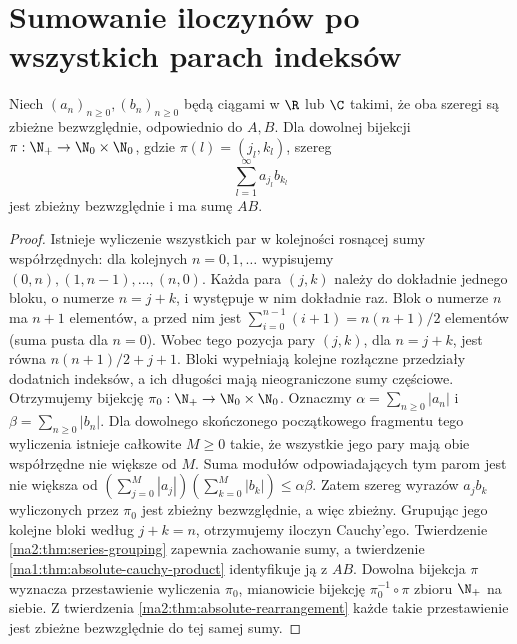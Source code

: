 \section{Sumowanie iloczynów po wszystkich parach indeksów}
\begin{twierdzenie}
\label{ma1:thm:pair-enumeration}
Niech $(a_n)_{n\ge0},(b_n)_{n\ge0}$ będą ciągami w $\R$ lub $\C$ takimi, że oba szeregi są zbieżne bezwzględnie, odpowiednio do $A,B$. Dla dowolnej bijekcji $\pi:\N_+\to\N_0\times\N_0$, gdzie $\pi(l)=(j_l,k_l)$, szereg
\[
 \sum_{l=1}^\infty a_{j_l}b_{k_l}
\]
jest zbieżny bezwzględnie i ma sumę $AB$.
\end{twierdzenie}
\begin{proof}
Istnieje wyliczenie wszystkich par w kolejności rosnącej sumy współrzędnych: dla kolejnych $n=0,1,\ldots$ wypisujemy $(0,n),(1,n-1),\ldots,(n,0)$. Każda para $(j,k)$ należy do dokładnie jednego bloku, o numerze $n=j+k$, i występuje w nim dokładnie raz. Blok o numerze $n$ ma $n+1$ elementów, a przed nim jest $\sum_{i=0}^{n-1}(i+1)=n(n+1)/2$ elementów (suma pusta dla $n=0$). Wobec tego pozycja pary $(j,k)$, dla $n=j+k$, jest równa $n(n+1)/2+j+1$. Bloki wypełniają kolejne rozłączne przedziały dodatnich indeksów, a ich długości mają nieograniczone sumy częściowe. Otrzymujemy bijekcję $\pi_0:\N_+\to\N_0\times\N_0$.
Oznaczmy $\alpha=\sum_{n\ge0}|a_n|$ i $\beta=\sum_{n\ge0}|b_n|$. Dla dowolnego skończonego początkowego fragmentu tego wyliczenia istnieje całkowite $M\ge0$ takie, że wszystkie jego pary mają obie współrzędne nie większe od $M$. Suma modułów odpowiadających tym parom jest nie większa od
$(\sum_{j=0}^M|a_j|)(\sum_{k=0}^M|b_k|)\le\alpha\beta$. Zatem szereg wyrazów $a_jb_k$ wyliczonych przez $\pi_0$ jest zbieżny bezwzględnie, a więc zbieżny.
Grupując jego kolejne bloki według $j+k=n$, otrzymujemy iloczyn Cauchy'ego. Twierdzenie \ref{ma2:thm:series-grouping} zapewnia zachowanie sumy, a twierdzenie \ref{ma1:thm:absolute-cauchy-product} identyfikuje ją z $AB$. Dowolna bijekcja $\pi$ wyznacza przestawienie wyliczenia $\pi_0$, mianowicie bijekcję $\pi_0^{-1}\circ\pi$ zbioru $\N_+$ na siebie. Z twierdzenia \ref{ma2:thm:absolute-rearrangement} każde takie przestawienie jest zbieżne bezwzględnie do tej samej sumy.
\end{proof}

